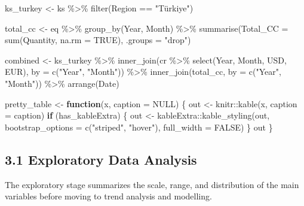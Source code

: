 \documentclass[
  11pt,
  a4paper,
  DIV=11,
  numbers=noendperiod]{scrartcl}
\newenvironment{Shaded}{\begin{snugshade}}{\end{snugshade}}
\newcommand{\AttributeTok}[1]{\textcolor[rgb]{0.40,0.45,0.13}{#1}}
\newcommand{\ConstantTok}[1]{\textcolor[rgb]{0.56,0.35,0.01}{#1}}
\newcommand{\ControlFlowTok}[1]{\textcolor[rgb]{0.00,0.23,0.31}{\textbf{#1}}}
\newcommand{\FunctionTok}[1]{\textcolor[rgb]{0.28,0.35,0.67}{#1}}
\newcommand{\NormalTok}[1]{\textcolor[rgb]{0.00,0.23,0.31}{#1}}
\newcommand{\OtherTok}[1]{\textcolor[rgb]{0.00,0.23,0.31}{#1}}
\newcommand{\SpecialCharTok}[1]{\textcolor[rgb]{0.37,0.37,0.37}{#1}}
\newcommand{\StringTok}[1]{\textcolor[rgb]{0.13,0.47,0.30}{#1}}
\begin{document}
\begin{Shaded}
\begin{Highlighting}[]
\NormalTok{ks\_turkey }\OtherTok{\textless{}{-}}\NormalTok{ ks }\SpecialCharTok{\%\textgreater{}\%} \FunctionTok{filter}\NormalTok{(Region }\SpecialCharTok{==} \StringTok{"Türkiye"}\NormalTok{)}

\NormalTok{total\_cc }\OtherTok{\textless{}{-}}\NormalTok{ eq }\SpecialCharTok{\%\textgreater{}\%}
  \FunctionTok{group\_by}\NormalTok{(Year, Month) }\SpecialCharTok{\%\textgreater{}\%}
  \FunctionTok{summarise}\NormalTok{(}\AttributeTok{Total\_CC =} \FunctionTok{sum}\NormalTok{(Quantity, }\AttributeTok{na.rm =} \ConstantTok{TRUE}\NormalTok{), }\AttributeTok{.groups =} \StringTok{"drop"}\NormalTok{)}

\NormalTok{combined }\OtherTok{\textless{}{-}}\NormalTok{ ks\_turkey }\SpecialCharTok{\%\textgreater{}\%}
  \FunctionTok{inner\_join}\NormalTok{(cr }\SpecialCharTok{\%\textgreater{}\%} \FunctionTok{select}\NormalTok{(Year, Month, USD, EUR), }\AttributeTok{by =} \FunctionTok{c}\NormalTok{(}\StringTok{"Year"}\NormalTok{, }\StringTok{"Month"}\NormalTok{)) }\SpecialCharTok{\%\textgreater{}\%}
  \FunctionTok{inner\_join}\NormalTok{(total\_cc, }\AttributeTok{by =} \FunctionTok{c}\NormalTok{(}\StringTok{"Year"}\NormalTok{, }\StringTok{"Month"}\NormalTok{)) }\SpecialCharTok{\%\textgreater{}\%}
  \FunctionTok{arrange}\NormalTok{(Date)}

\NormalTok{pretty\_table }\OtherTok{\textless{}{-}} \ControlFlowTok{function}\NormalTok{(x, }\AttributeTok{caption =} \ConstantTok{NULL}\NormalTok{) \{}
\NormalTok{  out }\OtherTok{\textless{}{-}}\NormalTok{ knitr}\SpecialCharTok{::}\FunctionTok{kable}\NormalTok{(x, }\AttributeTok{caption =}\NormalTok{ caption)}
  \ControlFlowTok{if}\NormalTok{ (has\_kableExtra) \{}
\NormalTok{    out }\OtherTok{\textless{}{-}}\NormalTok{ kableExtra}\SpecialCharTok{::}\FunctionTok{kable\_styling}\NormalTok{(out, }\AttributeTok{bootstrap\_options =} \FunctionTok{c}\NormalTok{(}\StringTok{"striped"}\NormalTok{, }\StringTok{"hover"}\NormalTok{), }\AttributeTok{full\_width =} \ConstantTok{FALSE}\NormalTok{)}
\NormalTok{  \}}
\NormalTok{  out}
\NormalTok{\}}
\end{Highlighting}
\end{Shaded}

\subsection{3.1 Exploratory Data
Analysis}\label{exploratory-data-analysis}

The exploratory stage summarizes the scale, range, and distribution of
the main variables before moving to trend analysis and modelling.
\end{document}
